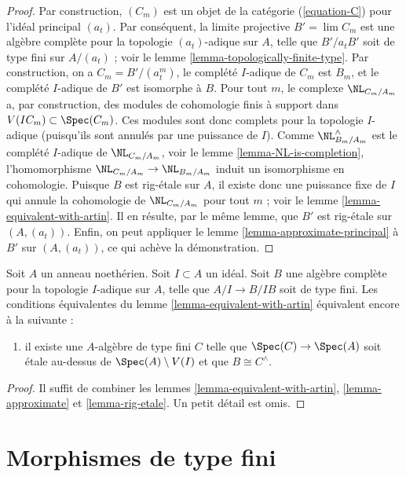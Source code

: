 \begin{proof}
\medskip\noindent
Par construction, $(C_m)$ est un objet de la catégorie
(\ref{equation-C}) pour l'idéal principal $(a_t)$. Par conséquent, la limite
projective $B' = \lim C_m$ est une algèbre complète pour la topologie
$(a_t)$-adique sur $A$, telle que $B'/a_t B'$ soit de type fini sur $A/(a_t)$ ; voir le
lemme \ref{lemma-topologically-finite-type}. Par construction, on a
$C_m = B'/(a_t^m)$, le complété $I$-adique de $C_m$ est $B_m$, et le complété
$I$-adique de $B'$ est isomorphe à $B$. Pour tout $m$, le complexe
$\NL_{C_m/A_m}$ a, par construction, des modules de cohomologie finis à
support dans $V(IC_m) \subset \Spec(C_m)$. Ces modules sont donc complets pour
la topologie $I$-adique (puisqu'ils sont annulés par une puissance de $I$).
Comme $\NL^\wedge_{B_m/A_m}$ est le complété $I$-adique de
$\NL_{C_m/A_m}$, voir le lemme \ref{lemma-NL-is-completion}, l'homomorphisme
$\NL_{C_m/A_m} \to \NL_{B_m/A_m}$ induit un isomorphisme en cohomologie.
Puisque $B$ est rig-étale sur $A$, il existe donc une puissance fixe de $I$
qui annule la cohomologie de $\NL_{C_m/A_m}$ pour tout $m$ ; voir le lemme
\ref{lemma-equivalent-with-artin}. Il en résulte, par le même lemme, que $B'$
est rig-étale sur $(A, (a_t))$. Enfin, on peut appliquer le lemme
\ref{lemma-approximate-principal} à $B'$ sur $(A, (a_t))$, ce qui achève la
démonstration.
\end{proof}

\begin{lemma}
\label{lemma-approximate-by-etale-over-complement}
Soit $A$ un anneau noethérien. Soit $I \subset A$ un idéal. Soit $B$ une
algèbre complète pour la topologie $I$-adique sur $A$, telle que
$A/I \to B/IB$ soit de type fini. Les conditions équivalentes du lemme
\ref{lemma-equivalent-with-artin} équivalent encore à la suivante :
\begin{enumerate}
\item[(8)]
\label{item-algebraize}
il existe une $A$-algèbre de type fini $C$ telle que
$\Spec(C) \to \Spec(A)$ soit étale au-dessus de
$\Spec(A) \setminus V(I)$ et que $B \cong C^\wedge$.
\end{enumerate}
\end{lemma}

\begin{proof}
Il suffit de combiner les lemmes \ref{lemma-equivalent-with-artin},
\ref{lemma-approximate} et \ref{lemma-rig-etale}. Un petit détail est omis.
\end{proof}




\section{Morphismes de type fini}
\label{section-finite-type}

